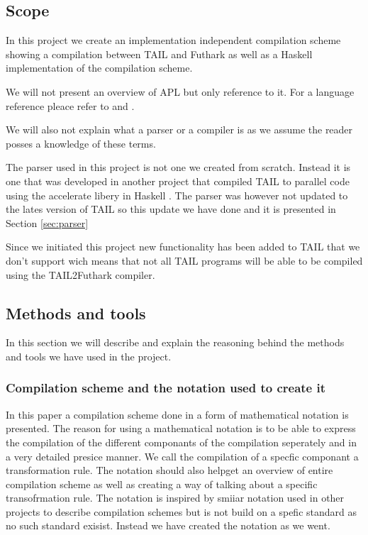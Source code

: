 \documentclass[11pt]{article}
\begin{document}
\subsection{Scope}
In this project we create an implementation independent compilation scheme showing a compilation between TAIL and Futhark as well as a Haskell implementation of the compilation scheme. 

We will not present an overview of APL but only reference to it. For a language reference pleace refer to \cite{APLbook} and \cite{APLDyalog}.

We will also not explain what a parser or a compiler is as we assume the reader posses a knowledge of these terms. 

The parser used in this project is not one we created from scratch. Instead it is one that was developed in another project  that compiled TAIL to parallel code using the accelerate libery in Haskell \cite{APLACC}. The parser was however not updated to the lates version of TAIL so this update we have done and it is presented in Section \ref{sec:parser}

Since we initiated this project new functionality has been added to TAIL that we don't support wich means that not all TAIL programs will be able to be compiled using the TAIL2Futhark compiler. 

\subsection{Methods and tools}
In this section we will describe and explain the reasoning behind the methods and tools we have used in the project. 

\subsubsection{Compilation scheme and the notation used to create it}
In this paper a compilation scheme done in a form of mathematical notation is presented. 
The reason for using a mathematical notation is to be able to express the compilation of the different componants of the compilation seperately and in a very detailed presice manner. We call the compilation of a specfic componant a transformation rule. 
The notation should also helpget an overview of entire compilation scheme as well as creating a way of talking about a specific transofrmation rule. The notation is inspired by smiiar notation used in other projects \cite{TorbenMogensen}\cite{MartinElsmanNotation} to describe compilation schemes but is not build on a spefic standard as no such standard exisist. Instead we have created the notation as we went.
\end{document}
